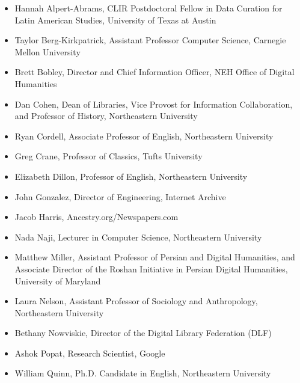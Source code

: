 \documentclass[twoside,11pt]{report}
\begin{document}
\begin{itemize}
  
\item Hannah Alpert-Abrams, CLIR Postdoctoral Fellow in Data Curation for Latin American Studies, University of Texas at Austin

\item Taylor Berg-Kirkpatrick, Assistant Professor Computer Science, Carnegie Mellon University

\item Brett Bobley, Director and Chief Information Officer, NEH Office of Digital Humanities

\item Dan Cohen, Dean of Libraries, Vice Provost for Information Collaboration, and Professor of History, Northeastern University

\item Ryan Cordell, Associate Professor of English, Northeastern University

\item Greg Crane, Professor of Classics, Tufts University

\item Elizabeth Dillon, Professor of English, Northeastern University

\item John Gonzalez, Director of Engineering, Internet Archive

\item Jacob Harris, Ancestry.org/Newspapers.com

\item Nada Naji, Lecturer in Computer Science, Northeastern University

\item Matthew Miller, Assistant Professor of Persian and Digital Humanities, and Associate Director of the Roshan Initiative in Persian Digital Humanities, University of Maryland

\item Laura Nelson, Assistant Professor of Sociology and Anthropology, Northeastern University

\item Bethany Nowviskie, Director of the Digital Library Federation (DLF)

\item Ashok Popat, Research Scientist, Google

\item William Quinn, Ph.D. Candidate in English, Northeastern University


\end{itemize}
\end{document}
